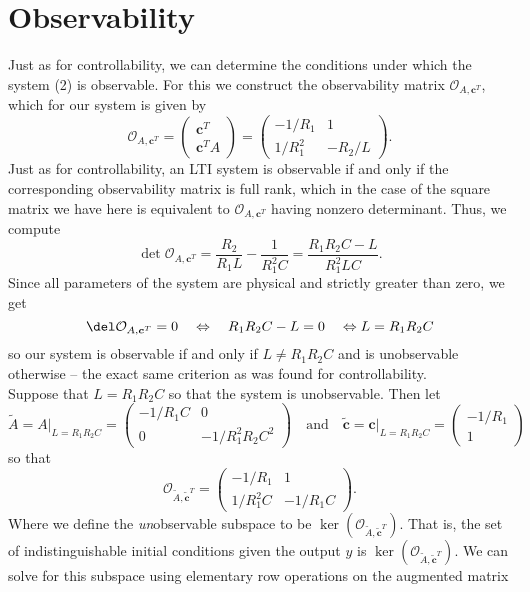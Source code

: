 \documentclass[11pt, letterpaper]{article}
\newcommand{\bs}[1]{\boldsymbol{#1}} %
\newcommand{\mc}[1]{\mathcal{#1}} %
\begin{document}
\section*{Observability}
Just as for controllability, we can determine the conditions under which the system (2) is observable. For this we construct the observability matrix $\mc{O}_{A,\bs{c}^T}$, which for our system is given by
\[\mc{O}_{A,\bs{c}^T}=\begin{pmatrix}
    \bs{c}^T\\
    \bs{c}^TA
\end{pmatrix}=\begin{pmatrix}
    -1/R_1 & 1\\
    1/R_1^2 & -R_2/L
\end{pmatrix}.\]
Just as for controllability, an LTI system is observable if and only if the corresponding observability matrix is full rank, which in the case of the square matrix we have here is equivalent to $\mc{O}_{A,\bs{c}^T}$ having nonzero determinant. Thus, we compute
\[\det\mc{O}_{A,\bs{c}^T}=\frac{R_2}{R_1L}-\frac{1}{R_1^2C}=\frac{R_1R_2C-L}{R_1^2LC}.\]
Since all parameters of the system are physical and strictly greater than zero, we get
\[\del\mc{O}_{A,\bs{c}^T}=0\quad\Leftrightarrow\quad R_1R_2C-L=0\quad\Leftrightarrow L=R_1R_2C\]
so our system is observable if and only if $L\neq R_1R_2C$ and is unobservable otherwise -- the exact same criterion as was found for controllability.\\[10pt]
Suppose that $L=R_1R_2C$ so that the system is unobservable. Then let
\[\tilde{A}=A\big|_{L=R_1R_2C}=\begin{pmatrix}
    -1/R_1C & 0\\
    0 & -1/R_1^2R_2C^2
\end{pmatrix}\quad\text{and}\quad \tilde{\bs{c}}=\bs{c}\big|_{L=R_1R_2C}=\begin{pmatrix}
    -1/R_1\\
    1
\end{pmatrix}\]
so that
\[\mc{O}_{\tilde{A},\tilde{\bs{c}}^T}=\begin{pmatrix}
    -1/R_1 & 1\\
    1/R_1^2C & -1/R_1C
\end{pmatrix}.\]
Where we define the {\it un}observable subspace to be $\ker(\mc{O}_{\tilde{A},\tilde{\bs{c}}^T})$. That is, the set of indistinguishable initial conditions given the output $y$ is $\ker(\mc{O}_{\tilde{A},\tilde{\bs{c}}^T})$. We can solve for this subspace using elementary row operations on the augmented matrix
\end{document}
